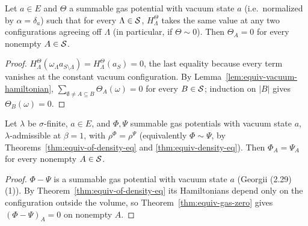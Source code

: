 \begin{theorem}
    \label{thm:equiv-gas-zero}
    \leanok

    Let $a \in E$ and $\Theta$ a summable gas potential with vacuum state $a$ (i.e.\ normalized by
    $\alpha = \delta_a$) such that for every $\Lambda \in \mathcal{S}$, $H_\Lambda^{\Theta}$ takes the
    same value at any two configurations agreeing off $\Lambda$ (in particular, if
    $\Theta \sim 0$). Then $\Theta_A = 0$ for every nonempty $A \in \mathcal{S}$.
\end{theorem}
\begin{proof}
    \leanok

    $H_\Lambda^\Theta(\omega_\Lambda a_{S\setminus\Lambda}) = H_\Lambda^\Theta(a_S) = 0$, the
    last equality because every term vanishes at the constant vacuum configuration. By
    Lemma~\ref{lem:equiv-vacuum-hamiltonian}, $\sum_{\emptyset \neq A \subseteq B}
    \Theta_A(\omega) = 0$ for every $B \in \mathcal{S}$; induction on $|B|$ gives
    $\Theta_B(\omega) = 0$.
\end{proof}

\begin{theorem}
    \label{thm:equiv-gas-unique}
    \leanok

    Let $\lambda$ be $\sigma$-finite, $a \in E$, and $\Phi, \Psi$ summable gas potentials with
    vacuum state $a$, $\lambda$-admissible at $\beta = 1$, with $\rho^\Phi = \rho^\Psi$
    (equivalently $\Phi \sim \Psi$, by Theorems~\ref{thm:equiv-of-density-eq} and
    \ref{thm:equiv-density-eq}). Then $\Phi_A = \Psi_A$ for every nonempty $A \in \mathcal{S}$.
\end{theorem}
\begin{proof}
    \leanok

    $\Phi - \Psi$ is a summable gas potential with vacuum state $a$ (Georgii (2.29)(1)). By
    Theorem~\ref{thm:equiv-of-density-eq} its Hamiltonians depend only on the configuration
    outside the volume, so Theorem~\ref{thm:equiv-gas-zero} gives $(\Phi - \Psi)_A = 0$ on
    nonempty $A$.
\end{proof}

